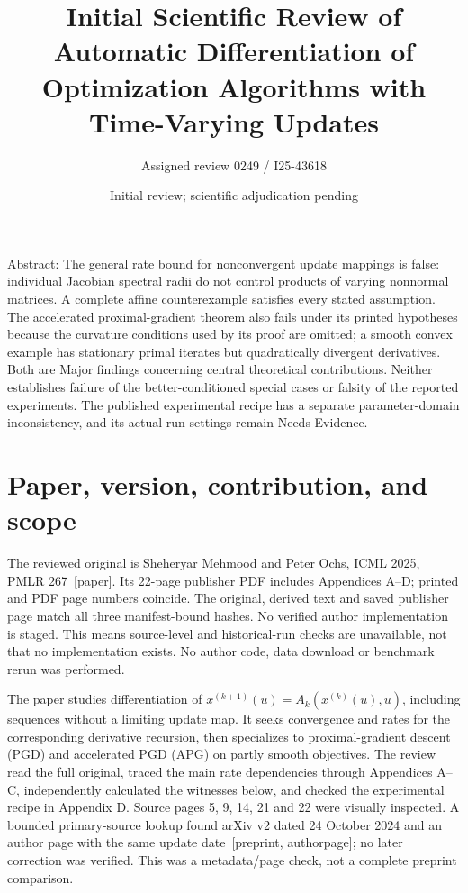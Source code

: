 \documentclass[10pt]{article}
\title{Initial Scientific Review of
Automatic Differentiation of Optimization Algorithms with Time-Varying Updates}
\author{Assigned review 0249 / I25-43618}
\date{Initial review; scientific adjudication pending}
\begin{document}
\maketitle
Abstract: The general rate bound for nonconvergent update mappings is false: individual Jacobian spectral radii do not control products of varying nonnormal matrices. A complete affine counterexample satisfies every stated assumption. The accelerated proximal-gradient theorem also fails under its printed hypotheses because the curvature conditions used by its proof are omitted; a smooth convex example has stationary primal iterates but quadratically divergent derivatives. Both are Major findings concerning central theoretical contributions. Neither establishes failure of the better-conditioned special cases or falsity of the reported experiments. The published experimental recipe has a separate parameter-domain inconsistency, and its actual run settings remain Needs Evidence.\par
\section*{Paper, version, contribution, and scope}
The reviewed original is Sheheryar Mehmood and Peter Ochs, ICML 2025, PMLR 267 [paper]. Its 22-page publisher PDF includes Appendices A–D; printed and PDF page numbers coincide. The original, derived text and saved publisher page match all three manifest-bound hashes. No verified author implementation is staged. This means source-level and historical-run checks are unavailable, not that no implementation exists. No author code, data download or benchmark rerun was performed.\par
The paper studies differentiation of \(x^{(k+1)}(u)=A_k(x^{(k)}(u),u)\), including sequences without a limiting update map. It seeks convergence and rates for the corresponding derivative recursion, then specializes to proximal-gradient descent (PGD) and accelerated PGD (APG) on partly smooth objectives. The review read the full original, traced the main rate dependencies through Appendices A–C, independently calculated the witnesses below, and checked the experimental recipe in Appendix D. Source pages 5, 9, 14, 21 and 22 were visually inspected. A bounded primary-source lookup found arXiv v2 dated 24 October 2024 and an author page with the same update date [preprint, authorpage]; no later correction was verified. This was a metadata/page check, not a complete preprint comparison.\par
\end{document}

